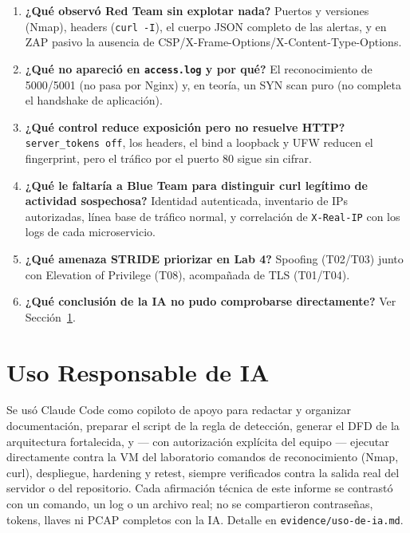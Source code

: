 \documentclass[journal]{IEEEtran}
\begin{document}
\begin{enumerate}
    \item \textbf{¿Qué observó Red Team sin explotar nada?} Puertos y
    versiones (Nmap), headers (\texttt{curl -I}), el cuerpo JSON completo de
    las alertas, y en ZAP pasivo la ausencia de CSP/X-Frame-Options/X-Content-Type-Options.
    \item \textbf{¿Qué no apareció en \texttt{access.log} y por qué?} El
    reconocimiento de 5000/5001 (no pasa por Nginx) y, en teoría, un SYN scan
    puro (no completa el handshake de aplicación).
    \item \textbf{¿Qué control reduce exposición pero no resuelve HTTP?}
    \texttt{server\_tokens off}, los headers, el bind a loopback y UFW
    reducen el fingerprint, pero el tráfico por el puerto 80 sigue sin
    cifrar.
    \item \textbf{¿Qué le faltaría a Blue Team para distinguir curl legítimo
    de actividad sospechosa?} Identidad autenticada, inventario de IPs
    autorizadas, línea base de tráfico normal, y correlación de
    \texttt{X-Real-IP} con los logs de cada microservicio.
    \item \textbf{¿Qué amenaza STRIDE priorizar en Lab 4?} Spoofing
    (T02/T03) junto con Elevation of Privilege (T08), acompañada de TLS
    (T01/T04).
    \item \textbf{¿Qué conclusión de la IA no pudo comprobarse
    directamente?} Ver Sección~\ref{sec:ia}.
\end{enumerate}

\section{Uso Responsable de IA}
\label{sec:ia}

Se usó Claude Code como copiloto de apoyo para redactar y organizar
documentación, preparar el script de la regla de detección, generar el DFD
de la arquitectura fortalecida, y --- con autorización explícita del equipo
--- ejecutar directamente contra la VM del laboratorio comandos de
reconocimiento (Nmap, curl), despliegue, hardening y retest, siempre
verificados contra la salida real del servidor o del repositorio. Cada
afirmación técnica de este informe se contrastó con un comando, un log o un
archivo real; no se compartieron contraseñas, tokens, llaves ni PCAP
completos con la IA. Detalle en \texttt{evidence/uso-de-ia.md}.
\end{document}
